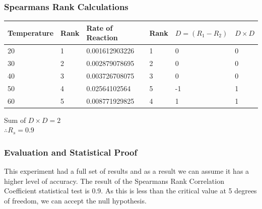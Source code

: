 \documentclass{thomasClass}
\begin{document}
\subsubsection{Spearmans Rank Calculations}
\begin{table}[H]
\begin{tabularx}{0.8\textwidth}{XX|XX|XX}
\multicolumn{1}{l}{Temperature} & \multicolumn{1}{l}{Rank} & \multicolumn{1}{l}{Rate of Reaction} & \multicolumn{1}{l}{Rank} & \multicolumn{1}{l}{$D=(R_1-R_2)$} & \multicolumn{1}{l}{$D\times D$} \\
\hline
20 & 1 & 0.001612903226 & 1 & 0 & 0 \\
30 & 2 & 0.002879078695 & 2 & 0 & 0 \\
40 & 3 & 0.003726708075 & 3 & 0 & 0 \\
50 & 4 & 0.02564102564 & 5 & -1 & 1 \\
60 & 5 & 0.008771929825 & 4 & 1 & 1
\end{tabularx}
\end{table}
Sum of $D\times D = 2$\\
$\therefore R_s=0.9$
\subsubsection{Evaluation and Statistical Proof}
This experiment had a full set of results and as a result we can assume it has a higher level of accuracy. The result of the Spearmans Rank Correlation Coefficient statistical test is 0.9. As this is less than the critical value at 5 degrees of freedom, we can accept the null hypothesis.
\end{document}

